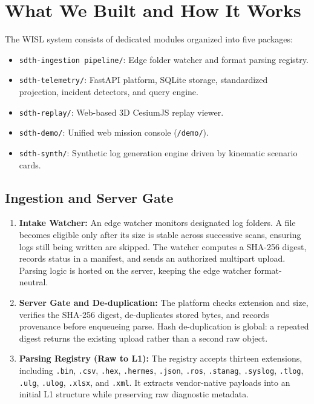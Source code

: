 \documentclass[11pt,a4paper]{article}
\newcommand{\code}[1]{\colorbox{codebg}{\small\texttt{\color{darkslate}#1}}}
\begin{document}
\clearpage

\section{What We Built and How It Works}

The WISL system consists of dedicated modules organized into five packages:
\begin{itemize}
    \item \code{sdth-ingestion pipeline/}: Edge folder watcher and format parsing registry.
    \item \code{sdth-telemetry/}: FastAPI platform, SQLite storage, standardized projection, incident detectors, and query engine.
    \item \code{sdth-replay/}: Web-based 3D CesiumJS replay viewer.
    \item \code{sdth-demo/}: Unified web mission console (\code{/demo/}).
    \item \code{sdth-synth/}: Synthetic log generation engine driven by kinematic scenario cards.
\end{itemize}

\subsection{Ingestion and Server Gate}
\begin{enumerate}
    \item \textbf{Intake Watcher:} An edge watcher monitors designated log folders. A file becomes eligible only after its size is stable across successive scans, ensuring logs still being written are skipped. The watcher computes a SHA-256 digest, records status in a manifest, and sends an authorized multipart upload. Parsing logic is hosted on the server, keeping the edge watcher format-neutral.
    \item \textbf{Server Gate and De-duplication:} The platform checks extension and size, verifies the SHA-256 digest, de-duplicates stored bytes, and records provenance before enqueueing parse. Hash de-duplication is global: a repeated digest returns the existing upload rather than a second raw object.
    \item \textbf{Parsing Registry (Raw to L1):} The registry accepts thirteen extensions, including \code{.bin}, \code{.csv}, \code{.hex}, \code{.hermes}, \code{.json}, \code{.ros}, \code{.stanag}, \code{.syslog}, \code{.tlog}, \code{.ulg}, \code{.ulog}, \code{.xlsx}, and \code{.xml}. It extracts vendor-native payloads into an initial L1 structure while preserving raw diagnostic metadata.
\end{enumerate}
\end{document}
